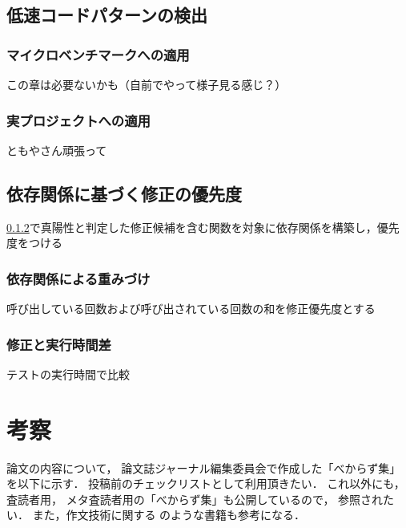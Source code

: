 \documentclass[submit,techrep,noauthor]{ipsj}
\begin{document}
\newpage%


\subsection{低速コードパターンの検出}

\subsubsection{マイクロベンチマークへの適用}

この章は必要ないかも（自前でやって様子見る感じ？）

\subsubsection{実プロジェクトへの適用}
\label{sec4.2.2:Item}

ともやさん頑張って


\subsection{依存関係に基づく修正の優先度}
\label{sec:Item}

\ref{sec4.2.2:Item}で真陽性と判定した修正候補を含む関数を対象に依存関係を構築し，優先度をつける

\subsubsection{依存関係による重みづけ}

呼び出している回数および呼び出されている回数の和を修正優先度とする

\subsubsection{修正と実行時間差}

テストの実行時間で比較


\section{考察}
\label{sec5:format}

論文の内容について，
論文誌ジャーナル編集委員会で作成した「べからず集」を以下に示す．
投稿前のチェックリストとして利用頂きたい．
これ以外にも，査読者用，
メタ査読者用の「べからず集」\cite{webpage2}も公開しているので，
参照されたい．
また，作文技術に関する \cite{book1, book2, book3, book4}のような書籍も参考になる．
\end{document}
